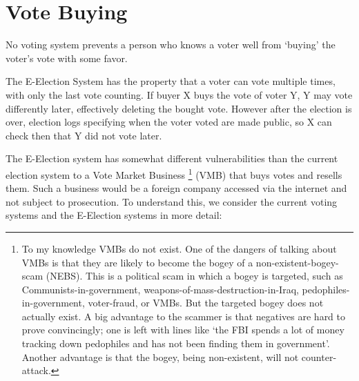 \documentclass[12pt]{article}
\begin{document}
\section{Vote Buying}

No voting system prevents a person who knows a voter well from
`buying' the voter's vote with some favor.

The E-Election System has the property that a voter
can vote multiple times, with only the last vote counting.
If buyer X buys the vote of voter Y, Y may vote differently
later, effectively deleting the bought vote.  However after
the election is over, election logs specifying when the voter
voted are made public, so X can check then that Y did not
vote later.

The E-Election system has somewhat different vulnerabilities than the current
election system to a Vote Market Business%
\footnote{To my knowledge VMBs do not exist.
One of the dangers of talking about VMBs is that they
are likely to become the bogey of a non-existent-bogey-scam (NEBS).  This is
a political scam in which a bogey is targeted, such as
Communists-in-government, weapons-of-mass-destruction-in-Iraq,
pedophiles-in-government, voter-fraud, or VMBs.
But the targeted bogey does not actually exist.
A big advantage to the scammer is that negatives are hard to prove
convincingly; one is left with lines like `the FBI spends a
lot of money tracking down pedophiles and has not been finding
them in government'.  Another advantage is that the bogey, being
non-existent, will not counter-attack.}%
(VMB) that buys
votes and resells them.  Such a business would be a foreign
company accessed via the internet and not subject to prosecution.
To understand this, we consider the current voting systems
and the E-Election systems in more detail:
\end{document}

